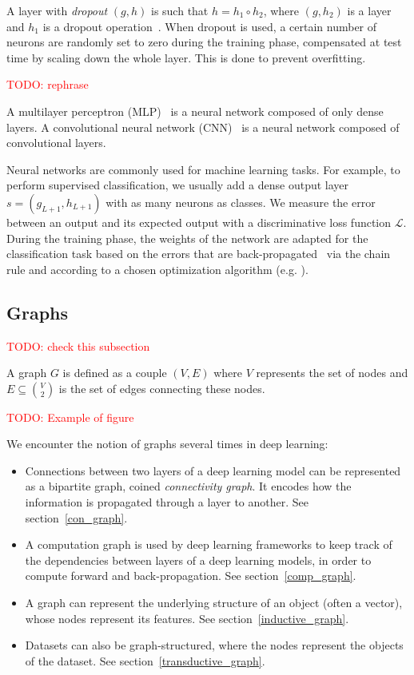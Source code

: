 \documentclass{article}
\theoremstyle{definition}
\theoremstyle{remark}
\theoremstyle{plain}
\newcommand{\todo}[1]{\textcolor{red}{TODO: #1\\}}
\begin{document}
A layer with \textit{dropout} $(g,h)$ is such that $h = h_1 \circ h_2$, where $(g,h_2)$ is a layer and $h_1$ is a dropout operation~\cite{srivastava2014dropout}. When dropout is used, a certain number of neurons are randomly set to zero during the training phase, compensated at test time by scaling down the whole layer. This is done to prevent overfitting.

\todo{rephrase}

A multilayer perceptron (MLP)~\cite{hornik1989multilayer} is a neural network composed of only dense layers.
A convolutional neural network (CNN)~\cite{lecun1998gradient} is a neural network composed of convolutional layers.

Neural networks are commonly used for machine learning tasks. For example, to perform supervised classification, we usually add a dense output layer $s=(g_{L+1},h_{L+1})$ with as many neurons as classes. We measure the error between an output and its expected output with a discriminative loss function $\mathcal{L}$. During the training phase, the weights of the network are adapted for the classification task based on the errors that are back-propagated~\cite{hornik1989multilayer} via the chain rule and according to a chosen optimization algorithm (e.g. \cite{bottou2010large}).

\subsection{Graphs}

\todo{check this subsection}

A graph $G$ is defined as a couple $(V,E)$ where $V$ represents the set of nodes and $E \subseteq\binom{V}{2}$ is the set of edges connecting these nodes.

\todo{Example of figure}

We encounter the notion of graphs several times in deep learning:
\begin{itemize}
\item Connections between two layers of a deep learning model can be represented as a bipartite graph, coined \emph{connectivity graph}. It encodes how the information is propagated through a layer to another. See section~\ref{con_graph}.
\item A computation graph is used by deep learning frameworks to keep track of the dependencies between layers of a deep learning models, in order to compute forward and back-propagation. See section~\ref{comp_graph}.
\item A graph can represent the underlying structure of an object (often a vector), whose nodes represent its features. See section~\ref{inductive_graph}.
\item Datasets can also be graph-structured, where the nodes represent the objects of the dataset. See section~\ref{transductive_graph}.
\end{itemize}
\end{document}
